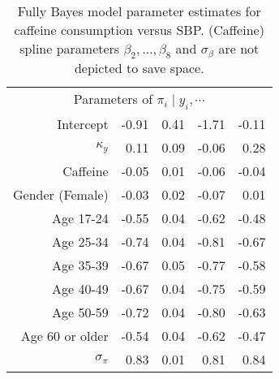 \documentclass[]{imsart}
\begin{document}
\begin{table}
\begin{center}
\begin{tabular}{rrrrr}
  \hline
      \multicolumn{5}{c}{Parameters of $\pi_i\mid y_i,\cdots$}\\
  Intercept &  -0.91 & 0.41 & -1.71 & -0.11 \\%
  $\kappa_y$&0.11 & 0.09 & -0.06 & 0.28 \\%
  Caffeine & -0.05 & 0.01 & -0.06 & -0.04 \\%
  Gender (Female)  & -0.03 & 0.02 & -0.07 & 0.01 \\%
 Age 17-24  & -0.55 & 0.04 & -0.62 & -0.48 \\ %
  Age 25-34  & -0.74 & 0.04 & -0.81 & -0.67 \\ %
  Age 35-39  & -0.67 & 0.05 & -0.77 & -0.58 \\ %
  Age 40-49  & -0.67 & 0.04 & -0.75 & -0.59 \\ %
  Age 50-59  & -0.72 & 0.04 & -0.80 & -0.63 \\ %
  Age 60 or older & -0.54 & 0.04 & -0.62 & -0.47 \\%
  $\sigma_\pi$ & 0.83 & 0.01 & 0.81 & 0.84 \\
   \hline
\end{tabular}
\end{center}
\caption{\label{table:caffeinewithageandgender}
Fully Bayes model parameter estimates for caffeine consumption versus SBP. (Caffeine) spline parameters $\beta_2,\dots,\beta_8$
and $\sigma_\beta$ are not depicted to save space.}
\end{table}
\FloatBarrier
\end{document}
